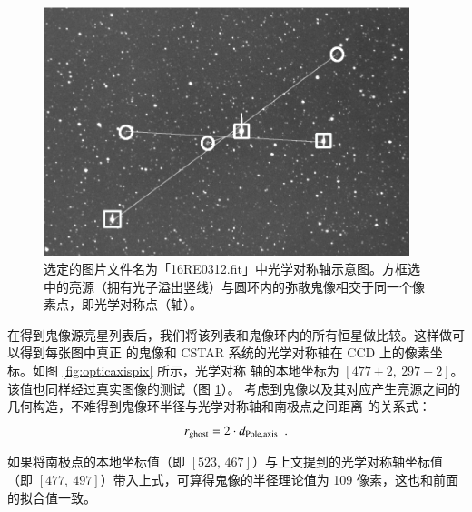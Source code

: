 \begin{figure}[t]
\centering
\includegraphics[width=0.95\textwidth]{figures/chapter2/f8_opticaxisimg.pdf}
\caption{选定的图片文件名为「16RE0312.fit」中光学对称轴示意图。方框选中的亮源（拥有光子溢出竖线）与圆环内的弥散鬼像相交于同一个像素点，即光学对称点（轴）。}
\label{fig:opticaxisimg}
\end{figure}

在得到鬼像源亮星列表后，我们将该列表和鬼像环内的所有恒星做比较。这样做可以得到每张图中真正
的鬼像和 CSTAR 系统的光学对称轴在 CCD 上的像素坐标。如图 \ref{fig:opticaxispix} 所示，光学对称
轴的本地坐标为 $[477\pm2,\ 297\pm2]$。该值也同样经过真实图像的测试（图 \ref{fig:opticaxisimg}）。
考虑到鬼像以及其对应产生亮源之间的几何构造，不难得到鬼像环半径与光学对称轴和南极点之间距离
的关系式：
\begin{equation} \label{eq:ghostgeometry}
r_{\mathrm{ghost}}=2\cdot d_{\mathrm{Pole, axis}} \ \ . 
\end{equation} 

如果将南极点的本地坐标值（即 $[523,\,467]$）与上文提到的光学对称轴坐标值（即 $[477,\ 497]$）带入上式，可算得鬼像的半径理论值为 109 像素，这也和前面的拟合值一致。

